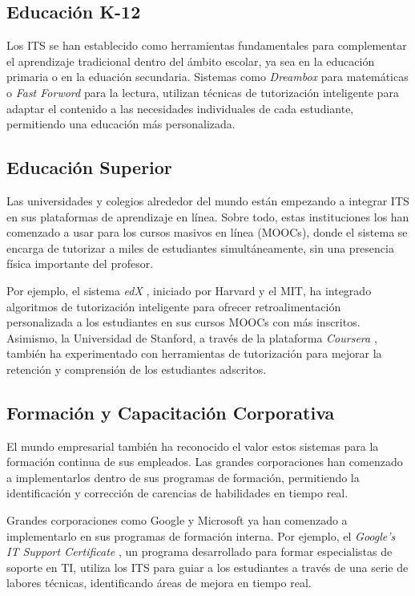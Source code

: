 \subsection{Educación K-12}

Los ITS se han establecido como herramientas fundamentales para complementar el aprendizaje tradicional dentro del ámbito escolar, ya sea en la educación primaria o en la eduación secundaria. Sistemas como \textit{Dreambox} \cite{dreambox} para matemáticas o \textit{Fast Forword} \cite{fastforword} para la lectura, utilizan técnicas de tutorización inteligente para adaptar el contenido a las necesidades individuales de cada estudiante, permitiendo una educación más personalizada.

\subsection{Educación Superior}

Las universidades y colegios alrededor del mundo están empezando a integrar ITS en sus plataformas de aprendizaje en línea. Sobre todo, estas instituciones los han comenzado a usar para los cursos masivos en línea (MOOCs), donde el sistema se encarga de tutorizar a miles de estudiantes simultáneamente, sin una presencia física importante del profesor.

Por ejemplo, el sistema \textit{edX} \cite{edx}, iniciado por Harvard y el MIT, ha integrado algoritmos de tutorización inteligente para ofrecer retroalimentación personalizada a los estudiantes en sus cursos MOOCs con más inscritos. Asimismo, la Universidad de Stanford, a través de la plataforma \textit{Coursera} \cite{coursera}, también ha experimentado con herramientas de tutorización para mejorar la retención y comprensión de los estudiantes adscritos. 

\subsection{Formación y Capacitación Corporativa}

El mundo empresarial también ha reconocido el valor estos sistemas para la formación continua de sus empleados. Las grandes corporaciones han comenzado a implementarlos dentro de sus programas de formación, permitiendo la identificación y corrección de carencias de habilidades en tiempo real.

Grandes corporaciones como Google y Microsoft ya han comenzado a implementarlo en sus programas de formación interna. Por ejemplo, el \textit{Google's IT Support Certificate} \cite{googleitsupport}, un programa desarrollado para formar especialistas de soporte en TI, utiliza los ITS para guiar a los estudiantes a través de una serie de labores técnicas, identificando áreas de mejora en tiempo real.

